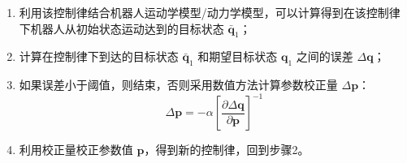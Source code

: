 \documentclass[../main.tex]{subfiles}
\begin{document}
\begin{enumerate}
\begin{itemize}
{\begin{enumerate}
                        \item 利用该控制律结合机器人运动学模型/动力学模型，可以计算得到在该控制律下机器人从初始状态运动达到的目标状态 $\bar{\mathbf{q}}_1$；
                        
                        \item 计算在控制律下到达的目标状态 $\bar{\mathbf{q}}_1$ 和期望目标状态 $\mathbf{q}_1$ 之间的误差 $\Delta \mathbf{q}$；
                        
                        \item 如果误差小于阈值，则结束，否则采用数值方法计算参数校正量 $\Delta \mathbf{p}$：
                        \[
                        \Delta \mathbf{p} = -\alpha \left[ \frac{\partial \Delta \mathbf{q}}{\partial \mathbf{p}} \right]^{-1}
                        \]
                        
                        \item 利用校正量校正参数值 $\mathbf{p}$，得到新的控制律，回到步骤2。
                        
                    \end{enumerate}}


\end{itemize}
\end{enumerate}
\end{document}
